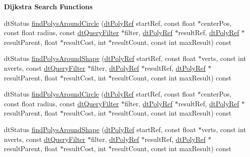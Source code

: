 \begin{Indent}\textbf{ Dijkstra Search Functions}\par
\begin{DoxyCompactItemize}
\item 
dt\+Status \hyperlink{classdtNavMeshQuery_a1131b39f205440349e7efe7f2d9b0ef9}{find\+Polys\+Around\+Circle} (\hyperlink{group__detour_gab4e0b2257a670c1a800057999612b466}{dt\+Poly\+Ref} start\+Ref, const float $\ast$center\+Pos, const float radius, const \hyperlink{classdtQueryFilter}{dt\+Query\+Filter} $\ast$filter, \hyperlink{group__detour_gab4e0b2257a670c1a800057999612b466}{dt\+Poly\+Ref} $\ast$result\+Ref, \hyperlink{group__detour_gab4e0b2257a670c1a800057999612b466}{dt\+Poly\+Ref} $\ast$result\+Parent, float $\ast$result\+Cost, int $\ast$result\+Count, const int max\+Result) const
\item 
dt\+Status \hyperlink{classdtNavMeshQuery_aa142b8c1e54bdefc39ab41507fe931d1}{find\+Polys\+Around\+Shape} (\hyperlink{group__detour_gab4e0b2257a670c1a800057999612b466}{dt\+Poly\+Ref} start\+Ref, const float $\ast$verts, const int nverts, const \hyperlink{classdtQueryFilter}{dt\+Query\+Filter} $\ast$filter, \hyperlink{group__detour_gab4e0b2257a670c1a800057999612b466}{dt\+Poly\+Ref} $\ast$result\+Ref, \hyperlink{group__detour_gab4e0b2257a670c1a800057999612b466}{dt\+Poly\+Ref} $\ast$result\+Parent, float $\ast$result\+Cost, int $\ast$result\+Count, const int max\+Result) const
\item 
dt\+Status \hyperlink{classdtNavMeshQuery_a1131b39f205440349e7efe7f2d9b0ef9}{find\+Polys\+Around\+Circle} (\hyperlink{group__detour_gab4e0b2257a670c1a800057999612b466}{dt\+Poly\+Ref} start\+Ref, const float $\ast$center\+Pos, const float radius, const \hyperlink{classdtQueryFilter}{dt\+Query\+Filter} $\ast$filter, \hyperlink{group__detour_gab4e0b2257a670c1a800057999612b466}{dt\+Poly\+Ref} $\ast$result\+Ref, \hyperlink{group__detour_gab4e0b2257a670c1a800057999612b466}{dt\+Poly\+Ref} $\ast$result\+Parent, float $\ast$result\+Cost, int $\ast$result\+Count, const int max\+Result) const
\item 
dt\+Status \hyperlink{classdtNavMeshQuery_aa142b8c1e54bdefc39ab41507fe931d1}{find\+Polys\+Around\+Shape} (\hyperlink{group__detour_gab4e0b2257a670c1a800057999612b466}{dt\+Poly\+Ref} start\+Ref, const float $\ast$verts, const int nverts, const \hyperlink{classdtQueryFilter}{dt\+Query\+Filter} $\ast$filter, \hyperlink{group__detour_gab4e0b2257a670c1a800057999612b466}{dt\+Poly\+Ref} $\ast$result\+Ref, \hyperlink{group__detour_gab4e0b2257a670c1a800057999612b466}{dt\+Poly\+Ref} $\ast$result\+Parent, float $\ast$result\+Cost, int $\ast$result\+Count, const int max\+Result) const
\end{DoxyCompactItemize}
\end{Indent}
